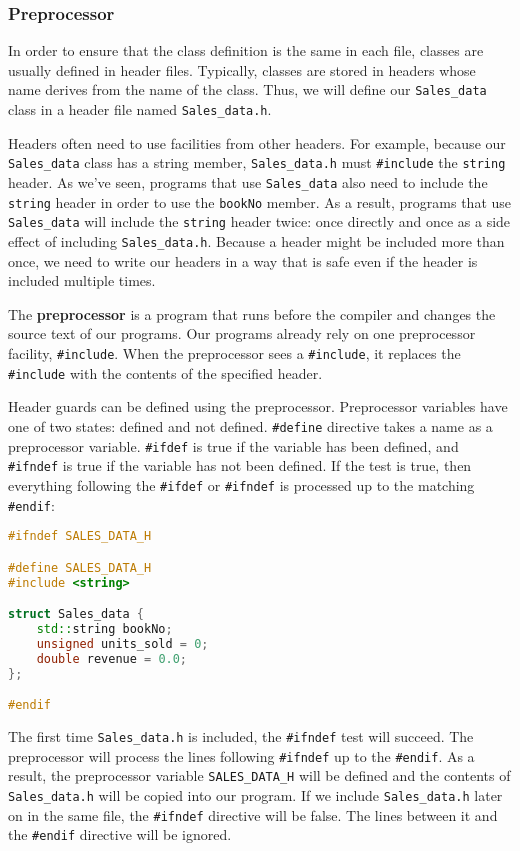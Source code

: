 \subsubsection{Preprocessor}

In order to ensure that the class definition is the same in each file, classes are usually defined in header files. Typically, classes are stored in headers whose name derives from the name of the class. Thus, we will define our \texttt{Sales\_data} class in a header file named \texttt{Sales\_data.h}.

Headers often need to use facilities from other headers. For example, because our \texttt{Sales\_data} class has a string member, \texttt{Sales\_data.h} must \texttt{\#include} the \texttt{string} header. As we’ve seen, programs that use \texttt{Sales\_data} also need to include the \texttt{string} header in order to use the \texttt{bookNo} member. As a result, programs that use \texttt{Sales\_data} will include the \texttt{string} header twice: once directly and once as a side effect of including \texttt{Sales\_data.h}. Because a header might be included more than once, we need to write our headers in a way that is safe even if the header is included multiple times.

The \textbf{preprocessor} is a program that runs before the compiler and changes the source text of our programs. Our programs already rely on one preprocessor facility, \texttt{\#include}. When the preprocessor sees a \texttt{\#include}, it replaces the \texttt{\#include} with the contents of the specified header.

Header guards can be defined using the preprocessor. Preprocessor variables have one of two states: defined and not defined. \texttt{\#define} directive takes a name as a preprocessor variable. \texttt{\#ifdef} is true if the variable has been defined, and \texttt{\#ifndef} is true if the variable has not been defined. If the test is true, then everything following the \texttt{\#ifdef} or \texttt{\#ifndef} is processed up to the matching \texttt{\#endif}:
\begin{lstlisting}[language=C++]
#ifndef SALES_DATA_H 

#define SALES_DATA_H 
#include <string> 

struct Sales_data { 
    std::string bookNo; 
    unsigned units_sold = 0; 
    double revenue = 0.0; 
};

#endif
\end{lstlisting}
The first time \texttt{Sales\_data.h} is included, the \texttt{\#ifndef} test will succeed. The preprocessor will process the lines following \texttt{\#ifndef} up to the \texttt{\#endif}. As a result, the preprocessor variable \texttt{SALES\_DATA\_H} will be defined and the contents of \texttt{Sales\_data.h} will be copied into our program. If we include \texttt{Sales\_data.h} later on in the same file, the \texttt{\#ifndef} directive will be false. The lines between it and the \texttt{\#endif} directive will be ignored.


